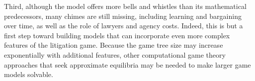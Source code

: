 \documentclass{article}
\begin{document}
Third, although the model offers more bells and whistles than its mathematical predecessors, many chimes are still missing, including learning and bargaining over time, as well as the role of lawyers and agency costs. Indeed, this is but a first step toward building models that can incorporate even more complex features of the litigation game. Because the game tree size may increase exponentially with additional features, other computational game theory approaches that seek approximate equilibria may be needed to make larger game models solvable. 

\printbibliography
\end{document}
